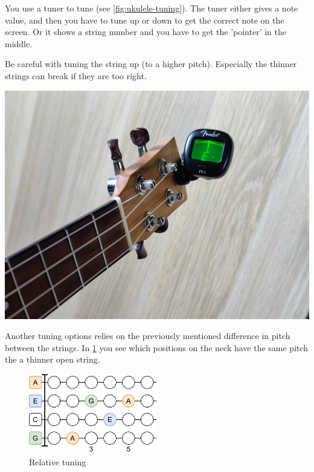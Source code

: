 \begin{minipage}{0.5\textwidth}
You use a tuner to tune (see \ref{fig:ukulele-tuning}). The tuner either gives a note value, and then you have to tune up or down to get the correct note on the screen. Or it shows a string number and you have to get the 'pointer' in the middle.

Be careful with tuning the string up (to a higher pitch). Especially the thinner strings can break if they are too right.
\end{minipage}
\hfill
\begin{minipage}{0.35\textwidth}
	\centering
	\includegraphics[width=\textwidth]{../Images/ukulele-tuning.jpg}
	\label{fig:ukulele-tuning}
\end{minipage}

Another tuning options relies on the previously mentioned difference in pitch between the strings. In \ref{fig:ukulele_relative_tuning} you see which positions on the neck have the same pitch the a thinner open string.

\begin{figure}[h]
	\centering
	\includegraphics[width=0.5\textwidth]{../Images/UkuleleRelativeTuning.png}
	\caption{Relative tuning}
	\label{fig:ukulele_relative_tuning}
\end{figure}
